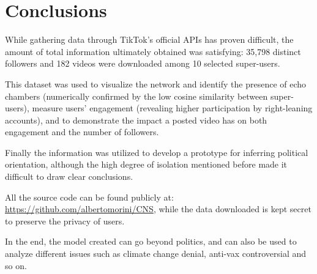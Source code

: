\section{Conclusions}

While gathering data through TikTok's official APIs has proven difficult, the amount of total information ultimately obtained was satisfying: 35,798 distinct followers and 182 videos were downloaded among 10 selected super-users.

This dataset was used to visualize the network and identify the presence of echo chambers (numerically confirmed by the low cosine similarity between super-users), measure users' engagement (revealing higher participation by right-leaning accounts), and to demonstrate the impact a posted video has on both engagement and the number of followers.

Finally the information was utilized to develop a prototype for inferring political orientation, although the high degree of isolation mentioned before made it difficult to draw clear conclusions.

All the source code can be found publicly at: \url{https://github.com/albertomorini/CNS}, while the data downloaded is kept secret to preserve the privacy of users.

In the end, the model created can go beyond politics, and can also be used to analyze different issues such as climate change denial, anti-vax controversial and so on.